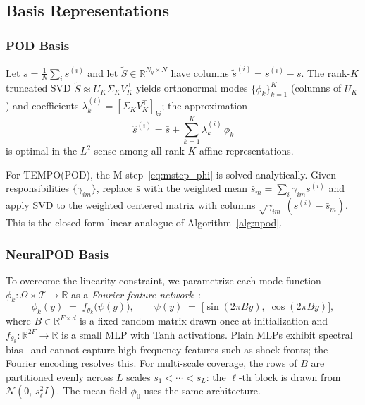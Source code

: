 \documentclass{article}
\begin{document}
\subsection{Basis Representations}\label{sec:bases}


\subsubsection{POD Basis}

Let $\bar{s} = \tfrac{1}{N}\sum_i s^{(i)}$ and let
$\tilde{S} \in \mathbb{R}^{N_y \times N}$ have columns
$\tilde{s}^{(i)} = s^{(i)} - \bar{s}$.
The rank-$K$ truncated SVD $\tilde{S} \approx U_K \Sigma_K V_K^\top$
yields orthonormal modes $\{\phi_k\}_{k=1}^K$ (columns of $U_K$) and
coefficients $\lambda_k^{(i)} = [\Sigma_K V_K^\top]_{ki}$; the
approximation
\begin{equation}
  \hat{s}^{(i)} = \bar{s} + \sum_{k=1}^{K} \lambda_k^{(i)}\,\phi_k
  \label{eq:pod_approx}
\end{equation}
is optimal in the $L^2$ sense among all rank-$K$ affine representations.

For TEMPO(POD), the M-step~\eqref{eq:mstep_phi} is solved analytically.
Given responsibilities $\{\gamma_{im}\}$, replace $\bar{s}$ with the
weighted mean $\bar{s}_m = \sum_i \gamma_{im} s^{(i)}$ and apply SVD to
the weighted centered matrix with columns
$\sqrt{\gamma_{im}}\,(s^{(i)}-\bar{s}_m)$.
This is the closed-form linear analogue of
Algorithm~\ref{alg:npod}.

\subsubsection{NeuralPOD Basis}\label{sec:neuralpod_basis}

To overcome the linearity constraint, we parametrize each mode
function $\phi_k : \Omega{\times}\mathcal{T} \to \mathbb{R}$ as a
\emph{Fourier feature network}~\cite{Tancik2020}:
\begin{equation}
  \phi_k(y) \;=\; f_{\theta_k}\!\bigl(\psi(y)\bigr),
  \qquad
  \psi(y) \;=\;
  \bigl[\sin(2\pi By),\;\cos(2\pi By)\bigr],
  \label{eq:ffn}
\end{equation}
where $B \in \mathbb{R}^{F \times d}$ is a fixed random matrix drawn
once at initialization and $f_{\theta_k} : \mathbb{R}^{2F} \to \mathbb{R}$
is a small MLP with Tanh activations.
Plain MLPs exhibit spectral bias~\cite{Rahaman2019} and cannot capture
high-frequency features such as shock fronts; the Fourier encoding
resolves this.
For multi-scale coverage, the rows of $B$ are partitioned evenly across
$L$ scales $s_1 < \cdots < s_L$: the $\ell$-th block is drawn from
$\mathcal{N}(0,\,s_\ell^2 I)$.
The mean field $\phi_0$ uses the same architecture.
\end{document}
